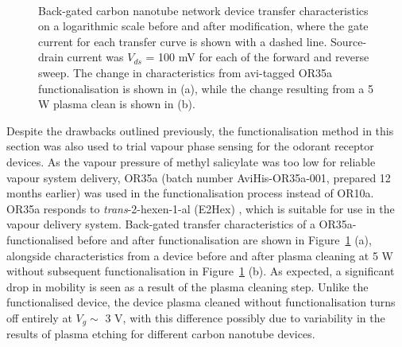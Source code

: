 \documentclass[
  a4paper,
]{scrbook}
\begin{document}
\begin{figure}
\begin{minipage}[t]{0.45\linewidth}
{{}

}

\end{minipage}%
%
\begin{minipage}[t]{0.01\linewidth}

{\centering 

~

}

\end{minipage}%

\caption{\label{fig-OR35a-TX-comparison}Back-gated carbon nanotube
network device transfer characteristics on a logarithmic scale before
and after modification, where the gate current for each transfer curve
is shown with a dashed line. Source-drain current was \(V_{ds}\) = 100
mV for each of the forward and reverse sweep. The change in
characteristics from avi-tagged OR35a functionalisation is shown in (a),
while the change resulting from a 5 W plasma clean is shown in (b).}

\end{figure}

Despite the drawbacks outlined previously, the functionalisation method
in this section was also used to trial vapour phase sensing for the
odorant receptor devices. As the vapour pressure of methyl salicylate
was too low for reliable vapour system delivery, OR35a (batch number
AviHis-OR35a-001, prepared 12 months earlier) was used in the
functionalisation process instead of OR10a. OR35a responds to
\emph{trans}-2-hexen-1-al (E2Hex) \autocite{Murugathas2019b}, which is
suitable for use in the vapour delivery system. Back-gated transfer
characteristics of a OR35a-functionalised before and after
functionalisation are shown in Figure~\ref{fig-OR35a-TX-comparison} (a),
alongside characteristics from a device before and after plasma cleaning
at 5 W without subsequent functionalisation in
Figure~\ref{fig-OR35a-TX-comparison} (b). As expected, a significant
drop in mobility is seen as a result of the plasma cleaning step. Unlike
the functionalised device, the device plasma cleaned without
functionalisation turns off entirely at \(V_g \sim\) 3 V, with this
difference possibly due to variability in the results of plasma etching
for different carbon nanotube devices.
\end{document}
